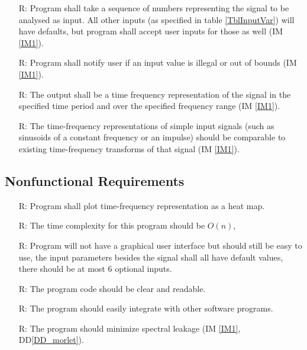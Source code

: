 \documentclass[12pt]{article}
\newcounter{reqnum} %
\begin{document}
\begin{itemize}

\item[R\refstepcounter{reqnum}\thereqnum \label{R_Inputs}:] Program shall take a sequence of numbers representing the signal to be analysed as input. All other inputs (as specified in table \ref{TblInputVar}) will have defaults, but program shall accept user inputs for those as well (IM \ref{IM1}).

\item[R\refstepcounter{reqnum}\thereqnum \label{R_illegal_input}:] Program shall notify user if an input value is illegal or out of bounds (IM \ref{IM1}).
  
\item[R\refstepcounter{reqnum}\thereqnum \label{R_OutputInputs}:] The output shall be a time frequency representation of the signal in the specified time period and over the specified frequency range (IM \ref{IM1}).

\item[R\refstepcounter{reqnum}\thereqnum \label{R_VerifyOutput}:] The time-frequency representations of simple input signals (such as sinusoids of a constant frequency or an impulse) should be comparable to existing time-frequency transforms of that signal (IM \ref{IM1}).

\end{itemize}

\subsection{Nonfunctional Requirements}

\begin{itemize}
\item[R\refstepcounter{reqnum}\thereqnum \label{R_heatmap}:] Program shall plot time-frequency representation as a heat map.
\item[R\refstepcounter{reqnum}\thereqnum \label{R_timecomplexity}:] The time complexity for this program should be $O(n)$,
\item[R\refstepcounter{reqnum}\thereqnum \label{R_useability}:] Program will not have a graphical user interface but should still be easy to use, the input parameters besides the signal shall all have default values, there should be at most 6 optional inputs.
\item[R\refstepcounter{reqnum}\thereqnum \label{R_readability}:] The program code should be clear and readable.
\item[R\refstepcounter{reqnum}\thereqnum \label{R_integration}:] The program should easily integrate with other software programs. 
\item[R\refstepcounter{reqnum}\thereqnum \label{R_spectral_leakage}:] The program should minimize spectral leakage (IM \ref{IM1}, DD\ref{DD_morlet}). 
\end{itemize}
\end{document}
